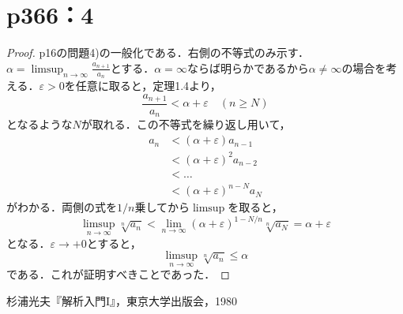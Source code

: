 \documentclass[a4paper,10pt,fleqn]{ltjsarticle}
\begin{document}
  \section*{p366：4}

  \begin{leftbar}
    \begin{proof}
      p16の問題4)の一般化である．右側の不等式のみ示す．
      $\alpha = \limsup _{n \to \infty} \frac{a_{n+1}}{a_{n}}$とする．$\alpha = \infty$ならば明らかであるから$\alpha \neq \infty$の場合を考える．$\varepsilon > 0$を任意に取ると，定理1.4より，
      \[
        \frac{a_{n+1}}{a_{n}} < \alpha + \varepsilon \quad (n \geq N)
      \]
      となるような$N$が取れる．この不等式を繰り返し用いて，
      \begin{align*}
        a_n
        &< (\alpha + \varepsilon) a_{n-1} \\
        &< (\alpha + \varepsilon)^2 a_{n-2} \\
        &< \ldots \\
        &< (\alpha + \varepsilon)^{n-N} a_N
      \end{align*}
      がわかる．両側の式を$1/n$乗してから$\limsup$を取ると，
      \[
        \limsup _{n \to \infty} \sqrt[n]{a_n} < \lim _{n \to \infty} (\alpha + \varepsilon)^{1-N/n} \sqrt[n]{a_N} = \alpha + \varepsilon 
      \]
      となる．$\varepsilon \to +0$とすると，
      \[
        \limsup _{n \to \infty} \sqrt[n]{a_n} \leq \alpha
      \]
      である．これが証明すべきことであった．
    \end{proof}
  \end{leftbar}

\newpage 

\begin{thebibliography}{9}
	 杉浦光夫『解析入門I』，東京大学出版会，1980
\end{thebibliography}
\end{document}
